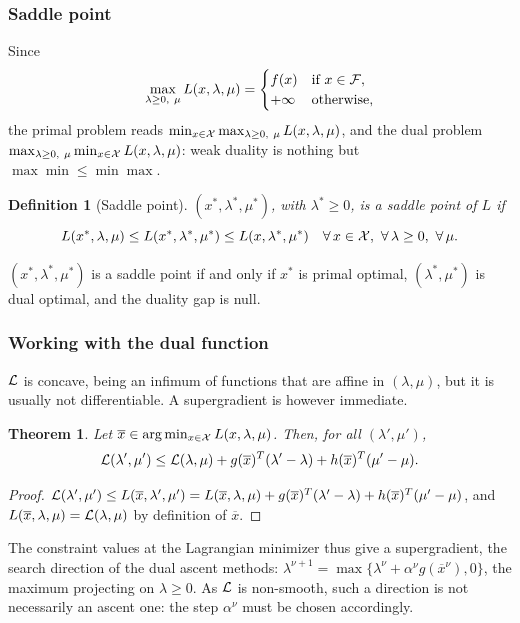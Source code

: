 \documentclass[usepdftitle=false,aspectratio=169]{beamer}
\newtheorem{defn}{Definition}
\newtheorem{thm}{Theorem}
\def\red{\color{red}}
\begin{document}
\begin{frame}
\frametitle{Saddle point}

Since
$$
\max_{\lambda \geq 0,\ \mu} L(x, \lambda, \mu) =
\begin{cases}
f(x) & \mbox{if } x \in {\mathcal{F}}, \\
+\infty & \mbox{otherwise,}
\end{cases}
$$
the primal problem reads $\min_{x \in {\mathcal{X}}} \max_{\lambda \geq 0,\ \mu} L(x,\lambda,\mu)$, and the dual problem
$\max_{\lambda \geq 0,\ \mu} \min_{x \in {\mathcal{X}}} L(x,\lambda,\mu)$: weak duality is nothing but $\max \min \leq \min \max$.

\begin{defn}[Saddle point]
$(x^*, \lambda^*, \mu^*)$, with $\lambda^* \geq 0$, is a saddle point of $L$ if
$$
L(x^*, \lambda, \mu) \leq L(x^*, \lambda^*, \mu^*) \leq L(x, \lambda^*, \mu^*)
\quad \forall\, x \in {\mathcal{X}},\ \forall\, \lambda \geq 0,\ \forall\, \mu.
$$
\end{defn}

$(x^*, \lambda^*, \mu^*)$ is a saddle point if and only if $x^*$ is primal optimal, $(\lambda^*, \mu^*)$ is dual optimal, and the duality gap is null.

\end{frame}

\begin{frame}
\frametitle{Working with the dual function}
\small

${\mathcal{L}}$ is concave, being an infimum of functions that are affine in $(\lambda, \mu)$, but it is usually {\red not differentiable}.
A supergradient is however immediate.

\begin{thm}
Let $\overline{x} \in \arg\min_{x \in {\mathcal{X}}} L(x, \lambda, \mu)$. Then, for all $(\lambda', \mu')$,
$$
{\mathcal{L}}(\lambda', \mu') \leq {\mathcal{L}}(\lambda, \mu) + g(\overline{x})^T(\lambda'-\lambda) + h(\overline{x})^T(\mu'-\mu).
$$
\end{thm}
\begin{proof}
${\mathcal{L}}(\lambda', \mu') \leq L(\overline{x}, \lambda', \mu')
= L(\overline{x}, \lambda, \mu) + g(\overline{x})^T(\lambda'-\lambda) + h(\overline{x})^T(\mu'-\mu)$,
and $L(\overline{x}, \lambda, \mu) = {\mathcal{L}}(\lambda, \mu)$ by definition of $\overline{x}$.
\end{proof}

The constraint values at the Lagrangian minimizer thus give a supergradient, the search direction of the {\red dual ascent} methods:
$\lambda^{\nu+1} = \max \lbrace \lambda^{\nu} + \alpha^{\nu} g(\overline{x}^{\nu}), 0 \rbrace$, the maximum projecting on $\lambda \geq 0$.
As ${\mathcal{L}}$ is non-smooth, such a direction is not necessarily an ascent one: the step $\alpha^{\nu}$ must be chosen accordingly.

\end{frame}
\end{document}
